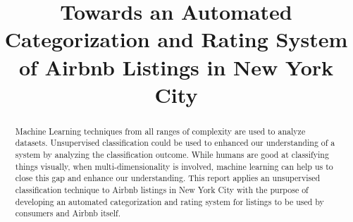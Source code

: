 \documentclass[conference]{IEEEtran}
\begin{document}
%
\title{Towards an Automated Categorization and Rating System of Airbnb Listings in New York City}


\author{
}



\maketitle

\begin{abstract}
Machine Learning techniques from all ranges of complexity are used to analyze datasets. Unsupervised classification could be used to enhanced our understanding of a system by analyzing the classification outcome. While humans are good at classifying things visually, when multi-dimensionality is involved, machine learning can help us to close this gap and enhance our understanding. This report applies an unsupervised classification technique to Airbnb listings in New York City with the purpose of developing an automated categorization and rating system for listings to be used by consumers and Airbnb itself.
\end{abstract}
\end{document}

